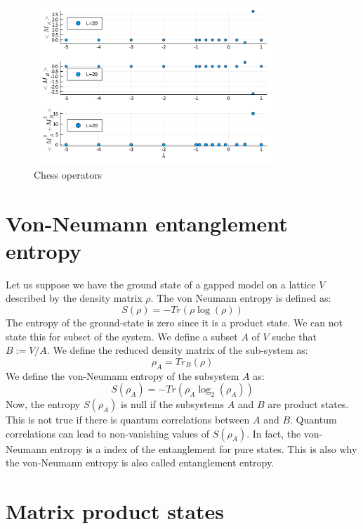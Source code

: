 \documentclass[12pt, a4paper, twoside, titlepage]{article}
\begin{document}
\begin{figure}[htp!]
  \centering
  \includegraphics[width=0.8\textwidth]{images/chessop.pdf}
  \caption{Chess operators}
  \label{}
\end{figure}


\section{Von-Neumann entanglement entropy}

Let us suppose we have the ground state of a gapped model on a lattice $V$ described by the density matrix $\rho$. The von  Neumann entropy is defined as:
\begin{equation}
S(\rho)=-Tr(\rho\log(\rho))
\end{equation}
The entropy of the ground-state is zero since it is a product state. We can not state this for subset of the system.
We define a subset $A$ of $V$ suche that $B:=V / A $. We define the reduced density matrix of the sub-system as:
\begin{equation} \label{eq:Apartition}
\rho_A=Tr_B(\rho)
\end{equation}
We define the von-Neumann entropy of the subsystem $A$ as:
\begin{equation}
S(\rho_A)=-Tr(\rho_A\log_2(\rho_A))
\end{equation}
Now, the entropy $S(\rho_A)$ is null if the subsystems $A$ and $B$ are product states. This is not true if there is quantum correlations between $A$ and $B$. Quantum correlations can lead to non-vanishing values of $S(\rho_A)$. In fact, the von-Neumann entropy is a index of the entanglement for pure states. This is also why the von-Neumann entropy is also called entanglement entropy.
\section{Matrix product states}
\end{document}
